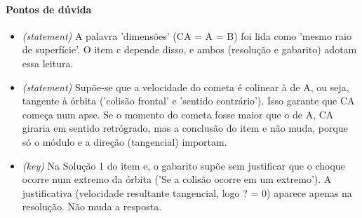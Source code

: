 \documentclass{article}%
\begin{document}
\paragraph{Pontos de dúvida}%
\begin{itemize}%
\item%
\textit{(statement)} A palavra 'dimensões' (CA = A = B) foi lida como 'mesmo raio de superfície'. O item c depende disso, e ambos (resolução e gabarito) adotam essa leitura.%
\item%
\textit{(statement)} Supõe{-}se que a velocidade do cometa é colinear à de A, ou seja, tangente à órbita ('colisão frontal' e 'sentido contrário'). Isso garante que CA começa num apse. Se o momento do cometa fosse maior que o de A, CA giraria em sentido retrógrado, mas a conclusão do item e não muda, porque só o módulo e a direção (tangencial) importam.%
\item%
\textit{(key)} Na Solução 1 do item e, o gabarito supõe sem justificar que o choque ocorre num extremo da órbita ('Se a colisão ocorre em um extremo'). A justificativa (velocidade resultante tangencial, logo ? = 0) aparece apenas na resolução. Não muda a resposta.%
\end{itemize}%
\end{document}
